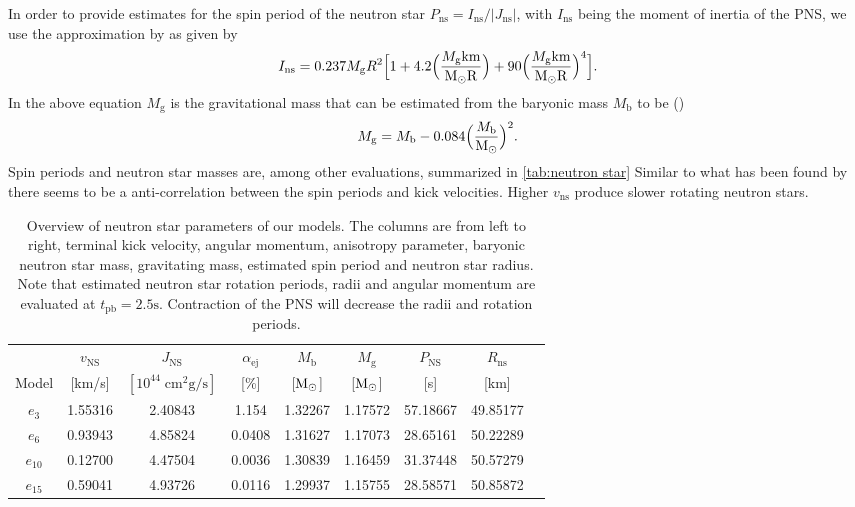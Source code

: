\documentclass[fleqn,usenatbib]{mnras}
\newcommand{\tpb}{\ensuremath{t_{\text{pb}}}}
\newcommand{\solm}{\xspace\ensuremath{\rm{M_{\odot}}}}
\renewcommand{\sec}{\xspace\ensuremath{\mathrm{s}}}
\newcommand{\rns}{$R_{\mathrm{ns}}$\xspace\xspace}
\begin{document}
In order to provide estimates for the spin period of the neutron star $P_{\mathrm{ns}}=I_{\mathrm{ns}}/|J_{\mathrm{ns}}|$, with $I_{\mathrm{ns}}$ being the moment of inertia of the PNS, we use the approximation by \citet{Lattimer2005} as given by
\begin{equation}
    I_{\mathrm{ns}} = 0.237M_{\mathrm{g}}R^2\Big[ 1 + 
    4.2 \Big( \frac{M_{\mathrm{g}} \mathrm{km }}{\solm R}\Big)  + 
    90 \Big( \frac{M_{\mathrm{g}} \mathrm{km }}{\solm R}\Big)^4
    \Big].
    \label{equ: ins}
\end{equation}
In the above equation $M_{\mathrm{g}}$ is the gravitational mass that can be estimated from the baryonic mass $M_{\mathrm{b}}$ to be (\citet{Lattimer2000})
\begin{equation}
    M_{\mathrm{g}} = M_{\mathrm{b}} - 0.084\Big( \frac{M_{\mathrm{b}}}{\solm}\Big)^2.
\end{equation}Spin periods and neutron star masses are, among other evaluations, summarized in \autoref{tab:neutron star}
Similar to what has been found by \citet{Muller2018b} there seems to be a anti-correlation between the spin periods and kick velocities. Higher $v_{\mathrm{ns}}$ produce slower rotating neutron stars.

\begin{table}
\centering
\begin{tabular}{ccccccccc}
            & $v_{\mathrm{NS}}$& $J_{\mathrm{NS}}$    & $\alpha_{\mathrm{ej}}$& $M_{\mathrm{b}}$& $M_{\mathrm{g}}$ & $P_{\mathrm{NS}}$& \rns \\
    Model & [km/s]           & $[10^{44}\; \mathrm{cm^2 g/s}]$ &         [\%]              &  [\solm]        &  [\solm]         & [s]              &  [km] \\
    
    \hline 
    $e_{3}$  &      1.55316 &             2.40843 &   1.154 &     1.32267 &      1.17572 &  57.18667 &  49.85177 \\
    $e_{6}$  &      0.93943 &             4.85824 &   0.0408 &     1.31627 &      1.17073 &  28.65161 &  50.22289 \\
    $e_{10}$ &      0.12700 &             4.47504 &   0.0036 &     1.30839 &      1.16459 &  31.37448 &  50.57279 \\
    $e_{15}$ &      0.59041 &             4.93726 &   0.0116 &     1.29937 &      1.15755 &  28.58571 &  50.85872
\end{tabular}
\caption{Overview of neutron star parameters of our models. The columns are from left to right, terminal kick velocity, angular momentum, anisotropy parameter, baryonic neutron star mass, gravitating mass, estimated spin period and neutron star radius. Note that estimated neutron star rotation periods, radii and angular momentum are evaluated at $\tpb=2.5\sec$. Contraction of the PNS will decrease the radii and rotation periods. }
\label{tab:neutron star}
\end{table}
\end{document}
